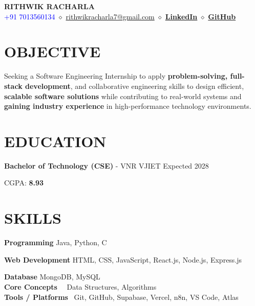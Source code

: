 \documentclass[letterpaper,11pt]{article}
\begin{document}
\begin{center}

{\Huge \textbf{RITHWIK RACHARLA}} \\[6pt]

\textcolor{blue}{+91 7013560134} \quad $\diamond$ \quad
\textcolor{blue}{\href{mailto:rithwikracharla7@gmail.com}{rithwikracharla7@gmail.com}} \quad $\diamond$ \quad
\textcolor{blue}{\href{https://www.linkedin.com/in/rithwik-racharla-488064211}{\textbf{LinkedIn}}} \quad $\diamond$ \quad
\textcolor{blue}{\href{https://github.com/Rithwik007}{\textbf{GitHub}}}

\end{center}

\section*{OBJECTIVE}

\noindent Seeking a Software Engineering Internship to apply \textbf{problem-solving, full-stack development}, and collaborative engineering skills to design efficient, \textbf{scalable software solutions} while contributing to real-world systems and \textbf{gaining industry experience} in high-performance technology environments.

\section*{EDUCATION}

\noindent \textbf{Bachelor of Technology (CSE)} - VNR VJIET \hfill Expected 2028

\noindent CGPA: \textbf{8.93}

\section*{SKILLS}


\noindent \textbf{Programming \quad \quad \quad \quad \quad \quad}  Java, Python, C 

\noindent \textbf{Web Development \quad \quad \quad \quad}  HTML, CSS, JavaScript, React.js, Node.js, Express.js 

\noindent \textbf{Database \quad \quad \quad \quad \quad \quad \quad \quad} MongoDB, MySQL \\
\noindent \textbf{Core Concepts \quad \quad \quad \quad \quad}  \ \ Data Structures, Algorithms \\
\noindent \textbf{Tools / Platforms \quad \quad \quad \quad } \ Git, GitHub, Supabase, Vercel, n8n, VS Code, Atlas
\end{document}
